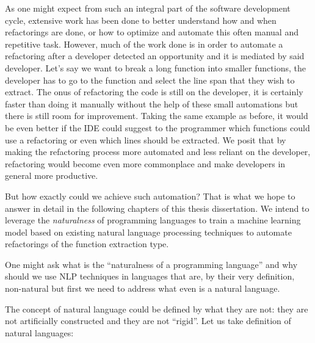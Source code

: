 As one might expect from such an integral part of the software development cycle, extensive work \citep{1001, 7vista, abid202030} has been done to better understand how and when refactorings are done, or how to optimize and automate this often manual and repetitive task.
However, much of the work done is in order to automate a refactoring after a developer detected an opportunity and it is mediated by said developer. Let's say we want to break a long function into smaller functions, the developer has to go to the function and select the line span that they wish to extract.
The onus of refactoring the code is still on the developer, it is certainly faster than doing it manually without the help of these small automations but there is still room for improvement. Taking the same example as before, it would be even better if the IDE could suggest to the programmer which functions could use a refactoring or even which lines should be extracted. We posit that by making the refactoring process more automated and less reliant on the developer, refactoring would become even more commonplace and make developers in general more productive.

But how exactly could we achieve such automation? That is what we hope to answer in detail in the following chapters of this thesis dissertation. We intend to leverage the \textit{naturalness} of programming languages to train a machine learning model based on existing natural language processing techniques to automate refactorings of the function extraction type.


One might ask what is the ``naturalness of a programming language'' and why should we use NLP techniques in languages that are, by their very definition, non-natural but first we need to address what even is a natural language. 

The concept of natural language could be defined by what they are not: they are not artificially constructed and they are not ``rigid''. Let us take \citet{lang_file} definition of natural languages:


